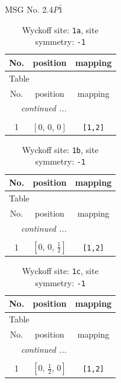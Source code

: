 \documentclass[fleqn,8pt]{jsarticle}
\begin{document}
\setcounter{MaxMatrixCols}{32}

\renewcommand{\tablename}{Table~}
\renewcommand{\figurename}{Figure~}
\begin{center}
\LARGE
MSG No. 2.4\quad$P\bar{1}$
\end{center}
\renewcommand{\arraystretch}{1.2}
\begin{longtable}{ccc}
\caption{Wyckoff site: {\tt 1a}, site symmetry: {\tt -1}}
 \\
 \hline \hline
No. & position & mapping \\ \hline \endfirsthead

\multicolumn{2}{l}{\tablename\ \thetable{}} \\
 \hline \hline
No. & position & mapping \\ \hline \endhead

 \hline \hline
\multicolumn{2}{r}{\footnotesize\it continued ...} \\ \endfoot

 \hline \hline
\multicolumn{2}{r}{} \\ \endlastfoot

1 & $\left[ 0,\, 0,\, 0 \right]$ & {\tt [1,2]} \\
\end{longtable}
\renewcommand{\arraystretch}{1.2}
\begin{longtable}{ccc}
\caption{Wyckoff site: {\tt 1b}, site symmetry: {\tt -1}}
 \\
 \hline \hline
No. & position & mapping \\ \hline \endfirsthead

\multicolumn{2}{l}{\tablename\ \thetable{}} \\
 \hline \hline
No. & position & mapping \\ \hline \endhead

 \hline \hline
\multicolumn{2}{r}{\footnotesize\it continued ...} \\ \endfoot

 \hline \hline
\multicolumn{2}{r}{} \\ \endlastfoot

1 & $\left[ 0,\, 0,\, \frac{1}{2} \right]$ & {\tt [1,2]} \\
\end{longtable}
\renewcommand{\arraystretch}{1.2}
\begin{longtable}{ccc}
\caption{Wyckoff site: {\tt 1c}, site symmetry: {\tt -1}}
 \\
 \hline \hline
No. & position & mapping \\ \hline \endfirsthead

\multicolumn{2}{l}{\tablename\ \thetable{}} \\
 \hline \hline
No. & position & mapping \\ \hline \endhead

 \hline \hline
\multicolumn{2}{r}{\footnotesize\it continued ...} \\ \endfoot

 \hline \hline
\multicolumn{2}{r}{} \\ \endlastfoot

1 & $\left[ 0,\, \frac{1}{2},\, 0 \right]$ & {\tt [1,2]} \\
\end{longtable}
\end{document}
